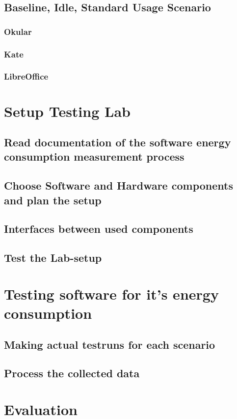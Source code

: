 \documentclass{article}
\begin{document}
\subsection{Baseline, Idle, Standard Usage Scenario}
\subsubsection{Okular}
\subsubsection{Kate}
\subsubsection{LibreOffice}

\section{Setup Testing Lab}
\subsection{Read documentation of the software energy consumption measurement process}
\subsection{Choose Software and Hardware components and plan the setup}
\subsection{Interfaces between used components}
\subsection{Test the Lab-setup}

\section{Testing software for it's energy consumption}
\subsection{Making actual testruns for each scenario}
\subsection{Process the collected data}

\section{Evaluation}
\end{document}
